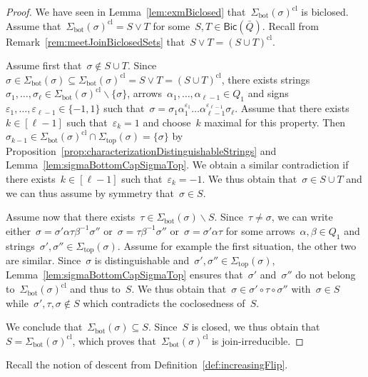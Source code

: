\documentclass{amsart}
\theoremstyle{definition}
\newcommand{\ssm}{\smallsetminus} %
\renewcommand{\top}{\mathrm{top}} %
\newcommand{\bottom}{\mathrm{bot}} %
\newcommand{\join}{\vee} %
\newcommand{\closure}[1]{#1^{\mathrm{cl}}} %
\newcommand{\Bicl}[1]{\mathsf{Bic}(#1)} %
\begin{document}
\begin{proof}
We have seen in Lemma~\ref{lem:exmBiclosed} that~$\closure{\Sigma_\bottom(\sigma)}$ is biclosed.
Assume that~$\closure{\Sigma_\bottom(\sigma)} = S \join T$ for some~$S,T \in \Bicl{\bar Q}$.
Recall from Remark~\ref{rem:meetJoinBiclosedSets} that~$S \join T = \closure{(S \cup T)}$.

Assume first that~$\sigma \notin S \cup T$.
Since~$\sigma \in \Sigma_\bottom(\sigma) \subseteq \closure{\Sigma_\bottom(\sigma)} = S \join T = \closure{(S \cup T)}$, there exists strings~$\sigma_1, \dots, \sigma_\ell \in \closure{\Sigma_\bottom(\sigma)} \ssm \{\sigma\}$, arrows~$\alpha_1, \dots, \alpha_{\ell-1} \in Q_1$ and signs~$\varepsilon_1, \dots, \varepsilon_{\ell-1} \in \{-1,1\}$ such that~$\sigma = \sigma_1 \alpha_1^{\varepsilon_1} \dots \alpha_{\ell-1}^{\varepsilon_{\ell-1}} \sigma_\ell$.
Assume that there exists~$k \in [\ell-1]$ such that~$\varepsilon_k = 1$ and choose~$k$ maximal for this property.
Then~$\sigma_{k-1} \in \closure{\Sigma_\bottom(\sigma)} \cap \Sigma_\top(\sigma) = \{\sigma\}$ by Proposition~\ref{prop:characterizationDistinguishableStrings} and Lemma~\ref{lem:sigmaBottomCapSigmaTop}.
We obtain a similar contradiction if there exists~$k \in [\ell-1]$ such that~$\varepsilon_k = -1$.
We thus obtain that~$\sigma \in S \cup T$ and we can thus assume by symmetry that~$\sigma \in S$.

Assume now that there exists~$\tau \in \Sigma_\bottom(\sigma) \ssm S$.
Since~$\tau \ne \sigma$, we can write either~$\sigma = \sigma' \alpha \tau \beta^{-1} \sigma''$ or~$\sigma = \tau \beta^{-1} \sigma''$ or~$\sigma = \sigma' \alpha \tau$ for some arrows~$\alpha, \beta \in Q_1$ and strings~$\sigma', \sigma'' \in \Sigma_\top(\sigma)$.
Assume for example the first situation, the other two are similar.
Since~$\sigma$ is distinguishable and~${\sigma', \sigma'' \in \Sigma_\top(\sigma)}$, Lemma~\ref{lem:sigmaBottomCapSigmaTop} ensures that~$\sigma'$ and~$\sigma''$ do not belong to~$\closure{\Sigma_\bottom(\sigma)}$ and thus to~$S$.
We thus obtain that~$\sigma \in \sigma' \circ \tau \circ \sigma''$ with~$\sigma \in S$ while~$\sigma', \tau, \sigma \notin S$ which contradicts the coclosedness of~$S$.

We conclude that~$\Sigma_\bottom(\sigma) \subseteq S$. Since~$S$ is closed, we thus obtain that~$S = \closure{\Sigma_\bottom(\sigma)}$, which proves that~$\closure{\Sigma_\bottom(\sigma)}$ is join-irreducible.
\end{proof}

Recall the notion of descent from Definition~\ref{def:increasingFlip}.
\end{document}
